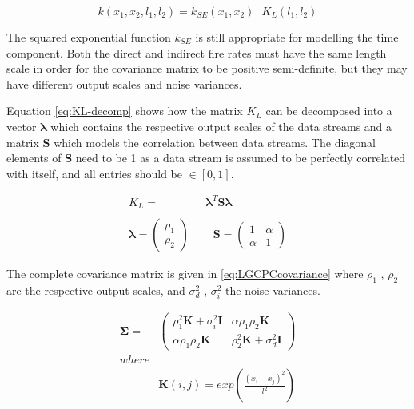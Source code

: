 \documentclass[a4paper,11pt]{report}
\begin{document}
\begin{equation} \label{eq:LGCPCcov}
k(x_1,x_2,l_1,l_2) = k_{SE}(x_1,x_2) \text{ } K_L(l_1,l_2) 
\end{equation}

The squared exponential function \(k_{SE}\) is still appropriate for modelling the time component. Both the direct and indirect fire rates must have the same length scale in order for the covariance matrix to be positive semi-definite, but they may have different output scales and noise variances.

Equation \ref{eq:KL-decomp} shows how the matrix \(K_L\) can be decomposed into a vector \(\boldsymbol{\lambda}\) which contains the respective output scales of the data streams and a matrix \(\mathbf{S}\) which models the correlation between data streams. The diagonal elements of \(\mathbf{S}\) need to be 1 as a data stream is assumed to be perfectly correlated with itself, and all entries should be \(\in [0,1]\).

\singlespacing
\begin{equation} \label{eq:KL-decomp}
\begin{aligned}
K_L =& \boldsymbol{\lambda}^T \mathbf{S} \boldsymbol{\lambda} \\ \\
\boldsymbol{\lambda} = \left( \begin{array}{cc}
\rho_1  \\
\rho_2 \end{array} \right)\text{ } & \text{ }
\mathbf{S} = \left( \begin{array}{cc}
1 & \alpha  \\
\alpha  & 1 \end{array} \right)
\end{aligned}
\end{equation}
\doublespacing

The complete covariance matrix is given in \ref{eq:LGCPCcovariance} where \(\rho_1\) , \(\rho_2\) are the respective output scales, and \(\sigma_d^2\) , \(\sigma_i^2\) the noise variances.

\begin{equation} \label{eq:LGCPCcovariance}
\begin{aligned}
\boldsymbol{\Sigma} =&  \left( \begin{array}{cc}
\rho_1^2 \mathbf{K} + \sigma_i^2 \mathbf{I} & \alpha \rho_1 \rho_2 \mathbf{K}  \\
\alpha \rho_1 \rho_2 \mathbf{K} & \rho_2^2 \mathbf{K} + \sigma_d^2 \mathbf{I} \end{array} \right) \\ where\\
&\mathbf{K}(i,j) = exp\left( \frac{(x_i-x_j)^2}{l^2}\right)
\end{aligned}
\end{equation}
\end{document}
